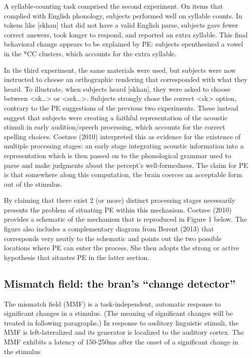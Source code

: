\documentclass[jou,apacite]{apa6}
\begin{document}
    A syllable-counting task comprised the second experiment. On items that complied with English phonology, subjects performed well on syllable counts. In tokens like [skhan] that did not have a valid English parse, subjects gave fewer correct answers, took longer to respond, and reported an extra syllable. This final behavioral change appears to be explained by PE: subjects epenthesized a vowel in the *CC clusters, which accounts for the extra syllable.
    
    In the third experiment, the same materials were used, but subjects were now instructed to choose an orthographic rendering that corresponded with what they heard. To illustrate, when subjects heard [skhan], they were asked to choose between <sk…> or <sek…>. Subjects strongly chose the correct <sk> option, contrary to the PE suggestions of the previous two experiments. These instead suggest that subjects were creating a faithful representation of the acoustic stimuli in early audition/speech processing, which accounts for the correct spelling choices. Coetzee (2010) interpreted this as evidence for the existence of multiple processing stages: an early stage integrating acoustic information into a representation which is then passed on to the phonological grammar used to parse and make judgments about the percept’s well-formedness. The claim for PE is that somewhere along this computation, the brain coerces an acceptable form out of the stimulus.
    
    By claiming that there exist 2 (or more) distinct processing stages necessarily presents the problem of situating PE within this mechanism. Coetzee (2010) provides a schematic of the mechanism that is reproduced in Figure 1 below. The figure also includes a complementary diagram from Berent (2013) that corresponds very neatly to the schematic and points out the two possible locations where PE can enter the process. She then adopts the strong or active hypothesis that situates PE in the latter section.
    
    \subsection{Mismatch field: the bran's ``change detector''}
    
    The mismatch field (MMF) is a task-independent, automatic response to significant changes in a stimulus. (The meaning of significant changes will be treated in following paragraphs.) In response to auditory linguistic stimuli, the MMF is left-lateralized and its generator is localized to the auditory cortex. The MMF exhibits a latency of 150-250ms after the onset of a significant change in the stimulus
    
\end{document}
